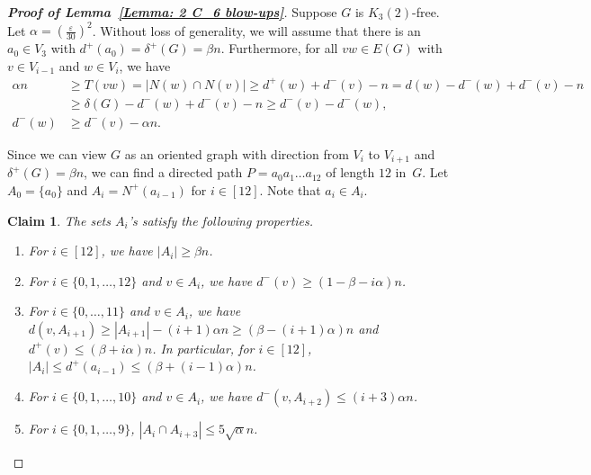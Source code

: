 \documentclass[11pt]{article}
\newtheorem{claim}[theorem]{Claim}
\newcommand{\eps}{\varepsilon}
\numberwithin{equation}{section}
\begin{document}
	
	
	
	\begin{proof}[\textbf{Proof of Lemma~\ref{Lemma: 2 C_6 blow-ups}}]
Suppose $G$ is $K_3(2)$-free. Let $\alpha = (\frac{\eps}{30})^2$. 
Without loss of generality, we will assume that there is an $a_0\in V_3$ with $d^+(a_0) = \delta^+(G) = \beta n $. 
Furthermore, for all $vw\in E(G)$ with $v\in V_{i-1}$ and $w\in V_{i}$, we have
\begin{align}
\alpha n &\ge T(vw) = | N(w)\cap N(v) | \ge d^+(w) + d^-(v) - n 
= d(w) - d^-(w) + d^-(v) - n \nonumber \\
& \ge \delta(G) - d^-(w) + d^-(v) - n 
\ge d^-(v) - d^-(w), \nonumber \\
			d^-(w)& \geq d^-(v)-\alpha n.	\label{eqn:vw}
	\end{align}

		

				
		Since we can view $G$ as an oriented graph with direction from $V_i$ to $V_{i+1}$ and $\delta^+(G) = \beta n$, we can find a directed path $P=a_0a_1\dots a_{12}$ of length $12$ in~$G$. 
		Let $A_0 = \{a_0\}$ and $A_i = {N}^+(a_{i-1})$ for $i\in [12]$. 
		Note that $a_i\in A_i$.
		

		
		\begin{claim}\label{Claim:A_i}
			The sets $A_i$'s satisfy the following properties.
			\begin{enumerate}[label = {\rm (\roman*)}]
				\item For $i\in [12]$, we have $|A_i|\geq \beta n$.
				\label{itm:C_6:1}
				
				\item For $i\in \{0,1,\dots,12\}$ and $v\in A_i$, we have $d^-(v)\geq (1-\beta-i\alpha)n$.
				\label{itm:C_6:2}
				
				\item For $i\in \{0,\dots,11\}$ and $v\in A_i$, we have $d(v, A_{i+1})\ge |A_{i+1}|-(i+1)\alpha n\geq (\beta -(i+1)\alpha)n$ and $d^+(v)\leq (\beta+i\alpha)n$. In particular, for $i\in [12]$, $|A_i|\leq d^+(a_{i-1})\leq (\beta +(i-1) \alpha)n$.
				\label{itm:C_6:3}
				
				\item For $i\in \{0,1,\dots,10\}$ and $v\in A_i$, we have $d^-(v,A_{i+2})\leq (i+3)\alpha n$.
				\label{itm:C_6:4}
				
				\item For $i\in \{0,1,\dots,9\}$, $|A_i\cap A_{i+3}|\leq 5\sqrt{\alpha} n$.
				\label{itm:C_6:5}
				

\end{enumerate}
\end{claim}
\end{proof}
\end{document}
